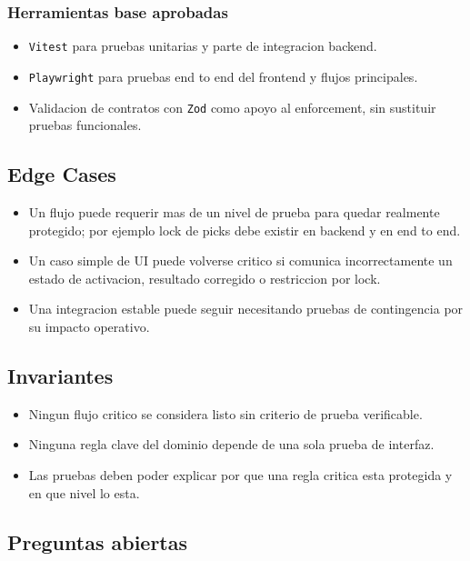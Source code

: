 \subsubsection{Herramientas base aprobadas}

\begin{itemize}
  \item \texttt{Vitest} para pruebas unitarias y parte de integracion backend.
  \item \texttt{Playwright} para pruebas end to end del frontend y flujos principales.
  \item Validacion de contratos con \texttt{Zod} como apoyo al enforcement, sin sustituir pruebas funcionales.
\end{itemize}

\subsection{Edge Cases}

\begin{itemize}
  \item Un flujo puede requerir mas de un nivel de prueba para quedar realmente protegido; por ejemplo lock de picks debe existir en backend y en end to end.
  \item Un caso simple de UI puede volverse critico si comunica incorrectamente un estado de activacion, resultado corregido o restriccion por lock.
  \item Una integracion estable puede seguir necesitando pruebas de contingencia por su impacto operativo.
\end{itemize}

\subsection{Invariantes}

\begin{itemize}
  \item Ningun flujo critico se considera listo sin criterio de prueba verificable.
  \item Ninguna regla clave del dominio depende de una sola prueba de interfaz.
  \item Las pruebas deben poder explicar por que una regla critica esta protegida y en que nivel lo esta.
\end{itemize}

\subsection{Preguntas abiertas}

